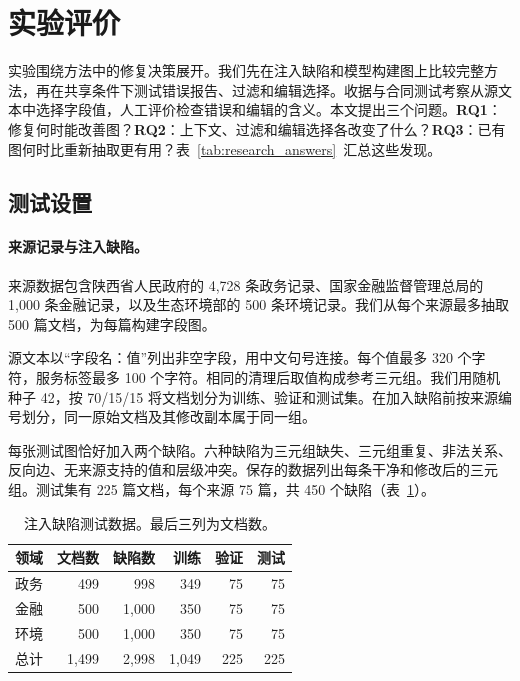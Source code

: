 \section{实验评价}
\label{sec:eval}
\label{sec:experiments}

实验围绕方法中的修复决策展开。我们先在注入缺陷和模型构建图上比较完整方法，再在共享条件下测试错误报告、过滤和编辑选择。收据与合同测试考察从源文本中选择字段值，人工评价检查错误和编辑的含义。本文提出三个问题。\textbf{RQ1}：修复何时能改善图？\textbf{RQ2}：上下文、过滤和编辑选择各改变了什么？\textbf{RQ3}：已有图何时比重新抽取更有用？表~\ref{tab:research_answers}~汇总这些发现。

\subsection{测试设置}
\label{sec:eval:setup}

\paragraph{来源记录与注入缺陷。}
来源数据包含陕西省人民政府的 4,728 条政务记录、国家金融监督管理总局的 1,000 条金融记录，以及生态环境部的 500 条环境记录。我们从每个来源最多抽取 500 篇文档，为每篇构建字段图。

源文本以“字段名：值”列出非空字段，用中文句号连接。每个值最多 320 个字符，服务标签最多 100 个字符。相同的清理后取值构成参考三元组。我们用随机种子 42，按 70/15/15 将文档划分为训练、验证和测试集。在加入缺陷前按来源编号划分，同一原始文档及其修改副本属于同一组。

每张测试图恰好加入两个缺陷。六种缺陷为三元组缺失、三元组重复、非法关系、反向边、无来源支持的值和层级冲突。保存的数据列出每条干净和修改后的三元组。测试集有 225 篇文档，每个来源 75 篇，共 450 个缺陷（表~\ref{tab:repair_benchmark}）。

\begin{table}[t]
\centering
\caption{注入缺陷测试数据。最后三列为文档数。}
\label{tab:repair_benchmark}
\small
\begin{tabular}{l r r r r r}
\toprule
领域 & 文档数 & 缺陷数 & 训练 & 验证 & 测试 \\
\midrule
政务 & 499 & 998 & 349 & 75 & 75 \\
金融 & 500 & 1,000 & 350 & 75 & 75 \\
环境 & 500 & 1,000 & 350 & 75 & 75 \\
\midrule
总计 & 1,499 & 2,998 & 1,049 & 225 & 225 \\
\bottomrule
\end{tabular}
\end{table}

